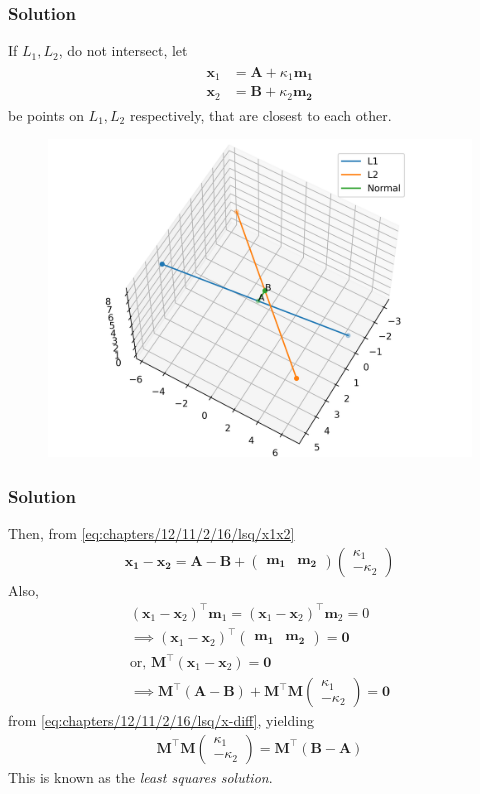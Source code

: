 \documentclass{beamer}
\providecommand{\brak}[1]{\ensuremath{\left(#1\right)}}
\theoremstyle{remark}
\newcommand{\myvec}[1]{\ensuremath{\begin{pmatrix}#1\end{pmatrix}}}
\let\vec\mathbf
\begin{document}
\begin{frame}
\frametitle{Solution}
If $L_1, L_2$, do not intersect, let 
\begin{align}
\begin{split}
	\vec{x}_1 &=\vec{A}+ \kappa_1\vec{m_1}
	\\
	\vec{x}_2 &= \vec{B}  + \kappa_2\vec{m_2} 
\end{split}
	    \label{eq:chapters/12/11/2/16/lsq/x1x2}
\end{align}
be points on 
$L_1, L_2$ respectively, that are closest to each other.
    \begin{figure}[!ht]
        \centering
        \includegraphics[width=0.5\columnwidth]{../chapters/12/11/2/16/lsq/figs/skew.png}
        \caption{}
    \end{figure}
\end{frame}
\begin{frame}
\frametitle{Solution}
Then, 
	    from \eqref{eq:chapters/12/11/2/16/lsq/x1x2}
\begin{align}
\vec{x_1} - \vec{x_2} =
	 \vec{A}-\vec{B}+
 \myvec{\vec{m_1} & \vec{m_2}}\myvec{\kappa_1\\-\kappa_2}
	\label{eq:chapters/12/11/2/16/lsq/x-diff}
\end{align}
Also, 
    \begin{align}
	    \brak{\vec{x}_1 -\vec{x}_2}^\top\vec{m}_1
	    =
	    \brak{\vec{x}_1 -\vec{x}_2}^\top\vec{m}_2
	    =0
	    \\
	    \implies 
	    \brak{\vec{x}_1 -\vec{x}_2}^\top\myvec{\vec{m_1} & \vec{m_2}} = \vec{0}
	    \\
	    \text{or, }	    \vec{M}^\top\brak{\vec{x}_1 -\vec{x}_2} = \vec{0}
	    \\
	    \implies \vec{M}^\top
	    \brak{\vec{A}-\vec{B}}+
 \vec{M}^\top\vec{M}\myvec{\kappa_1\\-\kappa_2} = \vec{0}
	    \label{eq:chapters/12/11/2/16/lsq/m-orth}
    \end{align}
	    from 
	\eqref{eq:chapters/12/11/2/16/lsq/x-diff},
	yielding
    \begin{align}
	    \vec{M}^\top\vec{M}\myvec{\kappa_1\\-\kappa_2} = \vec{M}^\top\brak{\vec{B}-\vec{A}}
        \label{eq:chapters/12/11/2/16/lsq/vec-eqn}
    \end{align}
    This is known as the {\em least squares solution}.
\end{frame}
\end{document}
